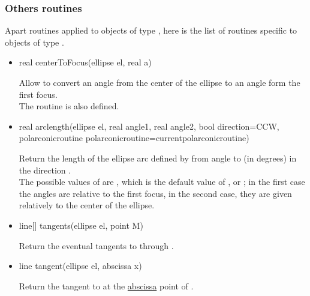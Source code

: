 \documentclass[pdftex]{article}
\begin{document}
\subsubsection{Others routines}
Apart routines applied to objects of type , here is the
list of routines specific to objects of type .
\begin{itemize}
\item {}
  \begin{Vcolor}
    real centerToFocus(ellipse el, real a)
  \end{Vcolor}
  Allow to convert an angle from the center of the ellipse to an angle
  form the first focus.\\
  The routine  is also defined.
\item {}
  \begin{Vcolor}
    real arclength(ellipse el, real angle1, real angle2,
    bool direction=CCW,
    polarconicroutine polarconicroutine=currentpolarconicroutine)
  \end{Vcolor}
  Return the length of the ellipse arc defined by  from
  angle  to  (in degrees) in the
  direction .\\
  The possible values of  are
  , which is the default value of\linebreak
  , or
  ; in the first case the
  angles are relative to the first focus, in the second case, they are
  given relatively to the center of the ellipse.
\item {}
  \begin{Vcolor}
    line[] tangents(ellipse el, point M)
  \end{Vcolor}
  Return the eventual tangents to  through .
\item {}
  \begin{Vcolor}
    line tangent(ellipse el, abscissa x)
  \end{Vcolor}
  Return the tangent to  at the 
  \href{#section.abscissa}{abscissa} point of .


\end{itemize}
\end{document}
